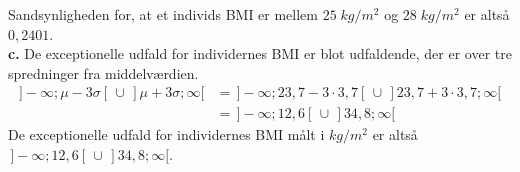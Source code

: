\documentclass{article}
\begin{document}
Sandsynligheden for, at et individs BMI er mellem $25 \;\unit{kg/m^2} $ og $28 \;\unit{kg/m^2} $ er altså $0,2401$.\\[1ex]
\textbf{c.}
De exceptionelle udfald for individernes BMI er blot udfaldende, der er over tre spredninger fra middelværdien.
\begin{equation*}
\begin{split}
  ]-\infty ; \mu - 3 \sigma [ \,\cup\, ]\mu +3 \sigma ; \infty [ &=\, ]-\infty ; 23,7 - 3 \cdot 3,7 [ \, \cup \, ] 23,7 +3 \cdot 3,7 ; \infty [ \\
  &=\,]-\infty ;12,6[ \,\cup\, ]34,8;\infty [
\end{split}
\end{equation*}
De exceptionelle udfald for individernes BMI målt i $\unit{kg/m^2}$ er altså $\,]-\infty ;12,6[ \,\cup\, ]34,8;\infty [$. 
\end{document}
